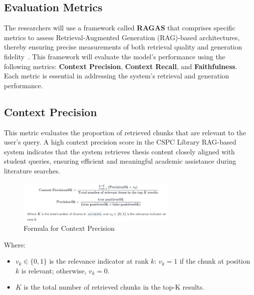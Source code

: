 \begin{refsection}
\section{Evaluation Metrics}

The researchers will use a framework called \textbf{RAGAS} that comprises specific metrics to assess Retrieval-Augmented Generation (RAG)-based architectures, thereby ensuring precise measurements of both retrieval quality and generation fidelity~\cite{oubah2024advanced}. This framework will evaluate the model's performance using the following metrics: \textbf{Context Precision}, \textbf{Context Recall}, and \textbf{Faithfulness}. Each metric is essential in addressing the system’s retrieval and generation performance.

\subsection*{Context Precision}

This metric evaluates the proportion of retrieved chunks that are relevant to the user’s query. A high context precision score in the CSPC Library RAG-based system indicates that the system retrieves thesis content closely aligned with student queries, ensuring efficient and meaningful academic assistance during literature searches.


\begin{figure}[H]
\centering
\includegraphics[width=0.7\textwidth]{figures/context_precision_formula.png}
\caption{Formula for Context Precision}
\label{fig:context_precision}
\end{figure}

\noindent Where:
\begin{itemize}
    \item $v_k \in \{0,1\}$ is the relevance indicator at rank $k$: $v_k = 1$ if the chunk at position $k$ is relevant; otherwise, $v_k = 0$.
    \item $K$ is the total number of retrieved chunks in the top-K results.
\end{itemize}


\end{refsection}

